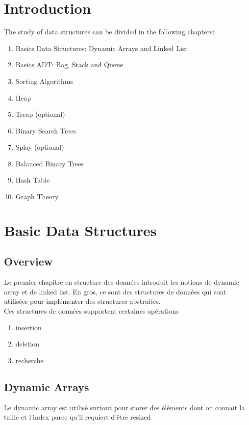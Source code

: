 \documentclass{article}
\begin{document}
\section{Introduction}

The study of data structures can be divided in the following chapters:

\begin{enumerate}
    \item Basics Data Structures: Dynamic Arrays and Linked List
    \item Basics ADT: Bag, Stack and Queue
    \item Sorting Algorithms
    \item Heap
    \item Treap (optional)
    \item Binary Search Trees
    \item Splay (optional)
    \item Balanced Binary Trees
    \item Hash Table
    \item Graph Theory
\end{enumerate}

\section{Basic Data Structures}

\subsection{Overview}

Le premier chapitre en structure des données introduit les notions de
dynamic array et de linked list. En gros, ce sont des structures de
données qui sont utilisées pour implémenter des structures abstraites.\\

Ces structures de données supportent certaines opérations
\begin{enumerate}
    \item insertion
    \item deletion
    \item recherche
\end{enumerate}

\subsection{Dynamic Arrays}

Le dynamic array est utilisé surtout pour storer des éléments dont on
connait la taille et l'index parce qu'il requiert d'être resized
\end{document}
